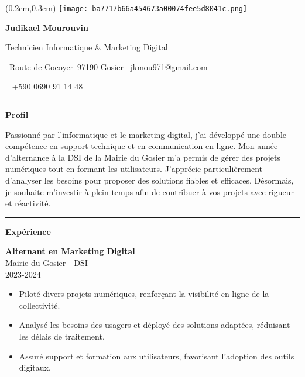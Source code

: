 \documentclass[a4paper]{article}
\renewcommand{\colorbox}[2]{#2}%
\newcommand{\fullrule}{\hspace{-1.5cm}\rule{\paperwidth}{0.4pt}}
\newcommand{\cvsection}[1]{%
  \vspace{6pt}\textbf{\Large #1}\par\vspace{2pt}}
\begin{document}
\color{white}
\begin{textblock*}{4cm}(0.2cm,0.3cm)
  \texttt{[image: ba7717b66a454673a00074fee5d8041c.png]}
\end{textblock*}

\begin{center}
  {\fontsize{44pt}{24pt}\selectfont\bfseries Judikael Mourouvin}

  \bigskip
  {\Large Technicien Informatique \& Marketing Digital}

  \bigskip\bigskip
  \faMapMarker~Route de Cocoyer\ 97190 Gosier
  \quad\faEnvelope~\href{mailto:jkmou971@gmail.com}{jkmou971@gmail.com}

  \bigskip
  \faPhone~ +590 0690 91 14 48
  \quad \faLinkedin\ \href{}{}
 

  \vspace{-0.3cm}
  \fullrule
\end{center}

\cvsection{Profil}
\hspace*{2.2cm}%
Passionné par l’informatique et le marketing digital, j’ai développé une double compétence en support technique et en communication en ligne. Mon année d’alternance à la DSI de la Mairie du Gosier m’a permis de gérer des projets numériques tout en formant les utilisateurs. J’apprécie particulièrement d’analyser les besoins pour proposer des solutions fiables et efficaces. Désormais, je souhaite m’investir à plein temps afin de contribuer à vos projets avec rigueur et réactivité.

\medskip\fullrule

\cvsection{Expérience}
\hspace*{1.3cm}%

\colorbox{maincolor}{%
  \begin{minipage}{\linewidth}
    \textbf{Alternant en Marketing Digital} \\ Mairie du Gosier - DSI \\ 2023-2024
    \begin{itemize}
      \item Piloté divers projets numériques, renforçant la visibilité en ligne de la collectivité. \item Analysé les besoins des usagers et déployé des solutions adaptées, réduisant les délais de traitement. \item Assuré support et formation aux utilisateurs, favorisant l’adoption des outils digitaux.
    \end{itemize}
  \end{minipage}}
\end{document}
